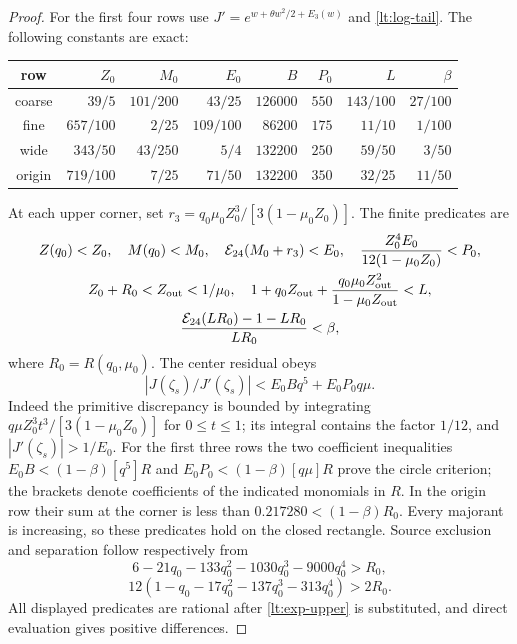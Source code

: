 \documentclass[11pt,reqno]{amsart}
\numberwithin{equation}{section}
\theoremstyle{definition}
\theoremstyle{remark}
\begin{document}
\begin{proof}
For the first four rows use $J'=e^{w+\theta w^2/2+E_3(w)}$ and
\eqref{lt:log-tail}. The following constants are exact:
\begin{center}\small
\begin{tabular}{c|rrrrrrr}
\toprule
row&$Z_0$&$M_0$&$E_0$&$B$&$P_0$&$L$&$\beta$\\\midrule
coarse&$39/5$&$101/200$&$43/25$&$126000$&$550$&$143/100$&$27/100$\\
fine&$657/100$&$2/25$&$109/100$&$86200$&$175$&$11/10$&$1/100$\\
wide&$343/50$&$43/250$&$5/4$&$132200$&$250$&$59/50$&$3/50$\\
origin&$719/100$&$7/25$&$71/50$&$132200$&$350$&$32/25$&$11/50$\\\bottomrule
\end{tabular}
\end{center}
At each upper corner, set
$r_3=q_0\mu_0 Z_0^3/[3(1-\mu_0Z_0)]$. The finite predicates are
\begin{gather}
 Z(q_0)<Z_0,\quad M(q_0)<M_0,\quad
 \mathcal E_{24}(M_0+r_3)<E_0,\quad
 \frac{Z_0^4E_0}{12(1-\mu_0Z_0)}<P_0,\label{lt:gaussian-gates1}\\
 Z_0+R_0<Z_{\mathrm{out}}<1/\mu_0,\quad
 1+q_0Z_{\mathrm{out}}+
 \frac{q_0\mu_0Z_{\mathrm{out}}^2}{1-\mu_0Z_{\mathrm{out}}}<L,\notag\\
 \frac{\mathcal E_{24}(LR_0)-1-LR_0}{LR_0}<\beta,
 \label{lt:gaussian-gates2}
\end{gather}
where $R_0=R(q_0,\mu_0)$. The center residual obeys
\[
 |J(\zeta_s)/J'(\zeta_s)|<E_0Bq^5+E_0P_0q\mu.
\]
Indeed the primitive discrepancy is bounded by integrating
$q\mu Z_0^3t^3/[3(1-\mu_0Z_0)]$ for $0\le t\le1$; its integral
contains the factor $1/12$, and $|J'(\zeta_s)|>1/E_0$.
For the first three rows the two coefficient inequalities
$E_0B<(1-\beta)[q^5]R$ and
$E_0P_0<(1-\beta)[q\mu]R$ prove the circle criterion; the brackets
denote coefficients of the indicated monomials in $R$.
In the origin
row their sum at the corner is less than $0.217280<(1-\beta)R_0$.
Every majorant is increasing, so these predicates hold on the
closed rectangle. Source exclusion and separation follow respectively
from
\[
 6-21q_0-133q_0^2-1030q_0^3-9000q_0^4>R_0,
\]
\[
 12(1-q_0-17q_0^2-137q_0^3-313q_0^4)>2R_0.
\]
All displayed predicates are rational after \eqref{lt:exp-upper} is
substituted, and direct evaluation gives positive differences.


\end{proof}
\end{document}
